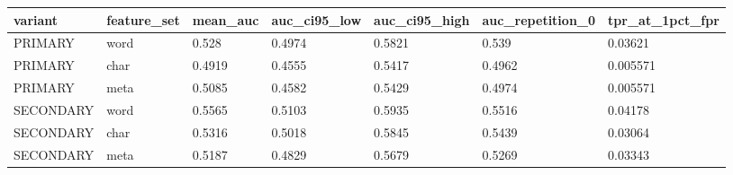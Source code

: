 \begin{tabular}{lllllll}
\toprule
variant & feature\_set & mean\_auc & auc\_ci95\_low & auc\_ci95\_high & auc\_repetition\_0 & tpr\_at\_1pct\_fpr \\
\midrule
PRIMARY & word & 0.528 & 0.4974 & 0.5821 & 0.539 & 0.03621 \\
PRIMARY & char & 0.4919 & 0.4555 & 0.5417 & 0.4962 & 0.005571 \\
PRIMARY & meta & 0.5085 & 0.4582 & 0.5429 & 0.4974 & 0.005571 \\
SECONDARY & word & 0.5565 & 0.5103 & 0.5935 & 0.5516 & 0.04178 \\
SECONDARY & char & 0.5316 & 0.5018 & 0.5845 & 0.5439 & 0.03064 \\
SECONDARY & meta & 0.5187 & 0.4829 & 0.5679 & 0.5269 & 0.03343 \\
\bottomrule
\end{tabular}
